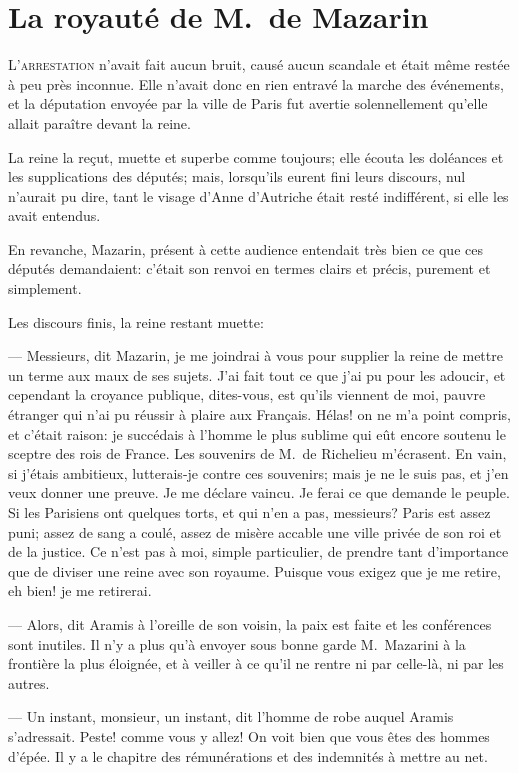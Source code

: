 \chapter{La royauté de M.~de Mazarin}

\lettrine{L}{'arrestation} n'avait fait aucun bruit, causé aucun scandale et était même restée à peu près inconnue. Elle n'avait donc en rien entravé la marche des événements, et la députation envoyée par la ville de Paris fut avertie solennellement qu'elle allait paraître devant la reine.

La reine la reçut, muette et superbe comme toujours; elle écouta les doléances et les supplications des députés; mais, lorsqu'ils eurent fini leurs discours, nul n'aurait pu dire, tant le visage d'Anne d'Autriche était resté indifférent, si elle les avait entendus.

En revanche, Mazarin, présent à cette audience entendait très bien ce que ces députés demandaient: c'était son renvoi en termes clairs et précis, purement et simplement.

Les discours finis, la reine restant muette:

— Messieurs, dit Mazarin, je me joindrai à vous pour supplier la reine de mettre un terme aux maux de ses sujets. J'ai fait tout ce que j'ai pu pour les adoucir, et cependant la croyance publique, dites-vous, est qu'ils viennent de moi, pauvre étranger qui n'ai pu réussir à plaire aux Français. Hélas! on ne m'a point compris, et c'était raison: je succédais à l'homme le plus sublime qui eût encore soutenu le sceptre des rois de France. Les souvenirs de M.~de Richelieu m'écrasent. En vain, si j'étais ambitieux, lutterais-je contre ces souvenirs; mais je ne le suis pas, et j'en veux donner une preuve. Je me déclare vaincu. Je ferai ce que demande le peuple. Si les Parisiens ont quelques torts, et qui n'en a pas, messieurs? Paris est assez puni; assez de sang a coulé, assez de misère accable une ville privée de son roi et de la justice. Ce n'est pas à moi, simple particulier, de prendre tant d'importance que de diviser une reine avec son royaume. Puisque vous exigez que je me retire, eh bien! je me retirerai.

— Alors, dit Aramis à l'oreille de son voisin, la paix est faite et les conférences sont inutiles. Il n'y a plus qu'à envoyer sous bonne garde M.~Mazarini à la frontière la plus éloignée, et à veiller à ce qu'il ne rentre ni par celle-là, ni par les autres.

— Un instant, monsieur, un instant, dit l'homme de robe auquel Aramis s'adressait. Peste! comme vous y allez! On voit bien que vous êtes des hommes d'épée. Il y a le chapitre des rémunérations et des indemnités à mettre au net.

